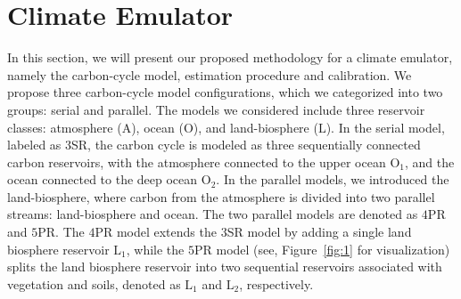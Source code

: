 \documentclass[11pt, a4paper, pdftex, twoside, dvipsnames]{article}
\renewcommand{\ref}{\cref}
\begin{document}
\section{Climate Emulator}\label{sec:clim_model}
In this section, we will present our proposed methodology for a climate emulator, namely the carbon-cycle model, estimation procedure and calibration. 
We propose three carbon-cycle model configurations, which we categorized into two groups: serial and parallel. The models we considered include three reservoir classes: atmosphere ($\text{A}$), ocean ($\text{O}$), and land-biosphere ($\text{L}$).
In the serial model, labeled as $3$SR, the carbon cycle is modeled as three sequentially connected carbon reservoirs, with the atmosphere connected to the upper ocean $\text{O}_1$, and the ocean connected to the deep ocean $\text{O}_2$. 
In the parallel models, we introduced the land-biosphere, where carbon from the atmosphere is divided into two parallel streams: land-biosphere and ocean. 
The two parallel models are denoted as $4$PR and $5$PR.
The $4$PR model extends the $3$SR model by adding a single land biosphere reservoir $\text{L}_1$, while the $5$PR model (see, Figure~\ref{fig:1} for visualization) splits the land biosphere reservoir into two sequential reservoirs associated with vegetation and soils, denoted as $\text{L}_1$ and $\text{L}_2$, respectively. 

\end{document}
